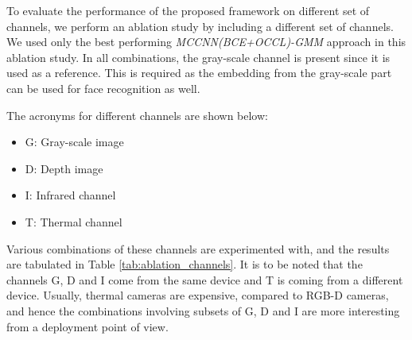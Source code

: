 \documentclass[journal]{IEEEtran}
\begin{document}
To evaluate the performance of the proposed framework on different set of channels, we perform an ablation study by including a different set of channels. We used only the best performing \textit{MCCNN(BCE+OCCL)-GMM} approach in this ablation study. In all combinations, the gray-scale channel is present since it is used as a reference. This is required as the embedding from the gray-scale part can be used for face recognition as well.

The acronyms for different channels are shown below:

\begin{itemize}
\item G: Gray-scale image
\item D: Depth image
\item I: Infrared channel
\item T: Thermal channel
\end{itemize}

Various combinations of these channels are experimented with, and the results are tabulated in Table \ref{tab:ablation_channels}. It is to be noted
that the channels G, D and I come from the same device and T is coming from a different device. Usually, thermal cameras are expensive, compared to RGB-D cameras, and hence the combinations involving subsets of G, D and I are more interesting from a deployment point of view.
\end{document}
